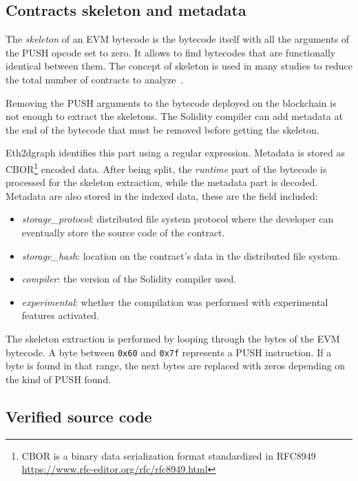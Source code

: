 \subsection{Contracts skeleton and metadata}
\label{skeleton-section}
The \textit{skeleton} of an EVM bytecode is the bytecode itself with all the arguments of the PUSH opcode set to zero. It allows to find bytecodes that are functionally identical between them. The concept of skeleton is used in many studies to reduce the total number of contracts to analyze~\cite{token-contracts}\cite{wallet-contracts}.

Removing the PUSH arguments to the bytecode deployed on the blockchain is not enough to extract the skeletons. The Solidity compiler can add metadata at the end of the bytecode that must be removed before getting the skeleton.  

Eth2dgraph identifies this part using a regular expression. Metadata is stored as CBOR\footnote{CBOR is a binary data serialization format standardized in RFC8949 \url{https://www.rfc-editor.org/rfc/rfc8949.html}} encoded data. After being split, the \textit{runtime} part of the bytecode is processed for the skeleton extraction, while the metadata part is decoded. Metadata are also stored in the indexed data, these are the field included:

\begin{itemize}
    \item \textit{storage\_protocol}: distributed file system protocol where the developer can eventually store the source code of the contract.
    \item \textit{storage\_hash}: location on the contract's data in the distributed file system.
    \item \textit{compiler}: the version of the Solidity compiler used.
    \item \textit{experimental}: whether the compilation was performed with experimental features activated.
\end{itemize}

The skeleton extraction is performed by looping through the bytes of the EVM bytecode. A byte between \texttt{0x60} and \texttt{0x7f} represents a PUSH instruction. If a byte is found in that range, the next bytes are replaced with zeros depending on the kind of PUSH found. 

\subsection{Verified source code}

